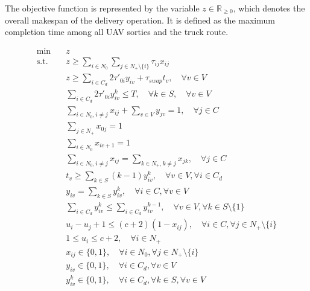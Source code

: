 \documentclass[3p, authoryear, 11pt]{elsarticle}
\begin{document}
The objective function is represented by the variable $z \in \mathbb{R}_{\geq 0}$, which denotes the overall makespan of the delivery operation. It is defined as the maximum completion time among all UAV sorties and the truck route.

\begin{align}
\text{min} \quad & z \label{eq:milp_obj} \\
\text{s.t.} \quad & z \geq \sum_{i \in N_0} \sum_{j \in N_+ \setminus \{i\}} \tau_{ij} x_{ij} \label{eq:milp_truck_makespan} \\
& z \geq \sum_{i \in C_d} 2\tau'_{0i} y_{iv} + \tau_{swap}t_v, \quad \forall v \in V \label{eq:milp_drone_makespan} \\
& \sum_{i\in C_d} 2\tau'_{0i} y^k_{iv} \leq T, \quad \forall k \in S, \quad \forall v \in V \label{eq:milp_endurance} \\
& \sum_{i \in N_0, i \neq j} x_{ij} + \sum_{v \in V} y_{jv} = 1, \quad \forall j \in C \label{eq:milp_visit} \\
& \sum_{j \in N_+} x_{0j} = 1 \label{eq:milp_truck_start} \\
& \sum_{i \in N_0} x_{ic+1} = 1 \label{eq:milp_truck_end} \\
& \sum_{i \in N_0, i \neq j} x_{ij} = \sum_{k \in N_+, k \neq j} x_{jk}, \quad \forall j \in C \label{eq:milp_flow} \\
& t_v \geq \sum_{k \in S} (k - 1) y^k_{iv}, \quad \forall v \in V, \forall i \in C_d \label{eq:milp_sbc_tv} \\
& y_{iv} = \sum_{k \in S} y^k_{iv}, \quad \forall i \in C, \forall v \in V \label{eq:milp_y_link} \\
& \sum_{i \in C_d} y^k_{iv} \leq \sum_{i \in C_d} y^{k-1}_{iv}, \quad \forall v \in V, \forall k \in S \setminus \{1\} \label{eq:milp_session_order} \\
& u_i - u_j + 1 \leq (c+2)(1 - x_{ij}), \quad \forall i \in C, \forall j \in N_+ \setminus \{i\} \label{eq:milp_mtz_1} \\
& 1 \leq u_i \leq c+2, \quad \forall i \in N_+ \label{eq:milp_mtz_2} \\
& x_{ij} \in \{0,1\}, \quad \forall i \in N_0, \forall j \in N_+ \setminus \{i\} \label{eq:milp_x_domain} \\
& y_{iv} \in \{0,1\}, \quad \forall i \in C_d, \forall v \in V \label{eq:milp_y_domain} \\
& y^k_{iv} \in \{0,1\}, \quad \forall i \in C_d, \forall k \in S, \forall v \in V \label{eq:milp_yk_domain} 

\end{align}
\end{document}

